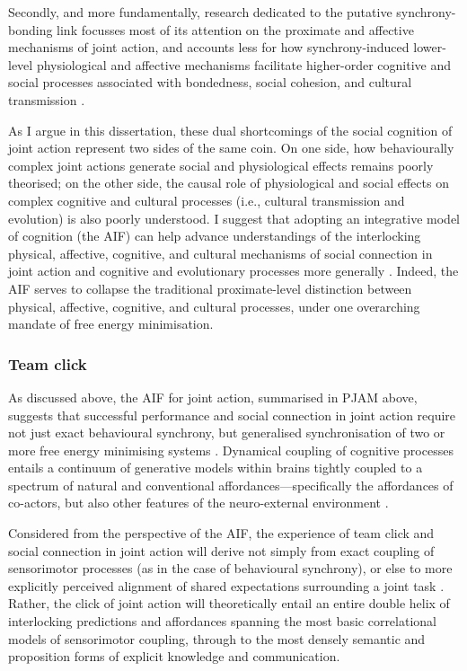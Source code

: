 \begin{CJK}{UTF8}{gbsn}

Secondly, and more fundamentally, research dedicated to the putative synchrony-bonding link focusses most of its attention on the proximate and affective mechanisms of joint action, and accounts less for how synchrony-induced lower-level physiological and affective mechanisms facilitate higher-order cognitive and social processes associated with bondedness, social cohesion, and cultural transmission \citep{Heyes2012}.

As I argue in this dissertation, these dual shortcomings of the social cognition of joint action represent two sides of the same coin. On one side, how behaviourally complex joint actions generate social and physiological effects remains poorly theorised; on the other side, the causal role of physiological and social effects on complex cognitive and cultural processes (i.e., cultural transmission and evolution) is also poorly understood.  I suggest that adopting an integrative model of cognition (the AIF) can help advance understandings of the interlocking physical, affective, cognitive, and cultural mechanisms of social connection in joint action and cognitive and evolutionary processes more generally \citep{Ramstead2018}. Indeed, the AIF serves to collapse the traditional proximate-level distinction between physical, affective, cognitive, and cultural processes, under one overarching mandate of free energy minimisation.

\subsubsection{Team click}
As discussed above, the AIF for joint action, summarised in PJAM above, suggests that successful performance and social connection in joint action require not just exact behavioural synchrony, but generalised synchronisation of two or more free energy minimising systems \citep{Friston2015}.  Dynamical coupling of cognitive processes entails a continuum of generative models within brains tightly coupled to a spectrum of natural and conventional affordances---specifically the affordances of co-actors, but also other features of the neuro-external environment \citep{Clark2015}.

Considered from the perspective of the AIF, the experience of team click and social connection in joint action will derive not simply from exact coupling of sensorimotor processes (as in the case of behavioural synchrony), or else to more explicitly perceived alignment of shared expectations surrounding a joint task \citep[cf.][]{VanderWel2012}.
Rather, the click of joint action will theoretically entail an entire double helix of interlocking predictions and affordances spanning the most basic correlational models of sensorimotor coupling, through to the most densely semantic and proposition forms of explicit knowledge and communication.


\end{CJK}
